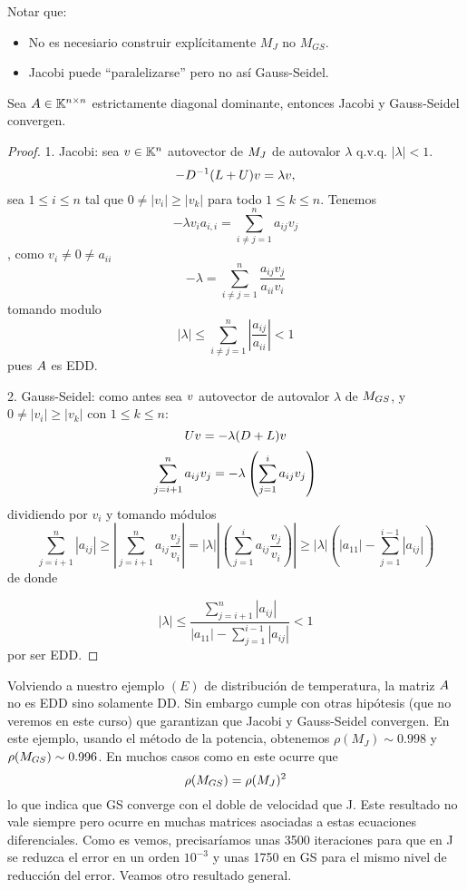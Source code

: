 Notar que:
\begin{itemize}
\item No es necesiario construir explícitamente $M_J$ no $M_{GS}$.
 \item Jacobi puede ``paralelizarse'' pero no así Gauss-Seidel.
\end{itemize}



\tcc
\begin{prop}
Sea $\Ab\in \Knn$ estrictamente diagonal dominante, entonces Jacobi y Gauss-Seidel convergen.
\end{prop}
\etcc
\begin{proof}
1. Jacobi: sea $\vb\in \Kn$ autovector de $\Mb_J$ de autovalor $\lambda$ q.v.q. $|\lambda|<1$.
$$
-D^{-1}(L+U)\vb=\lambda\vb,
$$
sea $1\le i\le n$ tal que
$0\neq |v_i|\ge |v_k|$ para todo $1\le k\le n$. Tenemos
$$
-\lambda v_ia_{i,i}=\sum_{i\neq j=1}^n a_{ij}v_j
$$, como $v_i\neq 0\neq a_{ii}$
$$
-\lambda=\sum_{i\neq j=1}^n \frac{a_{ij}v_j}{a_{ii}v_i}
$$
tomando modulo
$$
|\lambda|\le \sum_{i\neq j=1}^n |\frac{a_{ij}}{a_{ii}}|<1
$$
pues $\Ab$ es EDD.

2. Gauss-Seidel: como antes sea $\vb$ autovector de autovalor $\lambda$ de $\Mb_{GS}$, y $0\neq|v_i|\ge |v_k|$ con $1\le k\le n$:
$$
\Ub\vb=-\lambda(\Db+\Lb)\vb
$$
$$
\sum_{j=i+1}^na_{ij}\vb_j=-\lambda\left(
\sum_{j=1}^{i}a_{ij}\vb_j\right)
$$
dividiendo por $v_i$ y tomando módulos
$$
\sum_{j=i+1}^n|a_{ij}|
\ge \left|\sum_{j=i+1}^na_{ij}\frac{v_j}{v_i}\right|=|\lambda|\left|\left(
\sum_{j=1}^{i}a_{ij}\frac{v_j}{v_i}\right)\right|\ge |\lambda| \left(|a_{11}|-
\sum_{j=1}^{i-1}|a_{ij}|\right)
$$
de donde

$$
|\lambda|\le
\frac{\sum_{j=i+1}^n|a_{ij}|}{|a_{11}|-
\sum_{j=1}^{i-1}|a_{ij}|}
<1
$$
por ser EDD.
\end{proof}
\tcc
Volviendo a nuestro ejemplo $(E)$ de distribución de temperatura, la matriz $\Ab$ no es EDD sino solamente DD. Sin embargo cumple con otras hipótesis (que no veremos en este curso) que garantizan que Jacobi y Gauss-Seidel convergen. En este ejemplo, usando el método de la potencia,  obtenemos
 $\rho(M_J)\sim 0.998$ y  $\rho(\Mb_{GS})\sim 0.996$. En muchos casos como en este ocurre que 
$$
\rho(\Mb_{GS})=\rho(\Mb_{J})^2
$$
lo que indica que GS converge con el doble de velocidad que J. Este resultado no vale siempre pero ocurre  en muchas matrices asociadas a estas ecuaciones diferenciales.
Como es vemos, precisaríamos unas 3500 iteraciones para que en J se reduzca el error en un orden $10^{-3}$ y unas 1750 en GS para el mismo nivel de reducción del error.
\etcc
Veamos otro resultado general.

